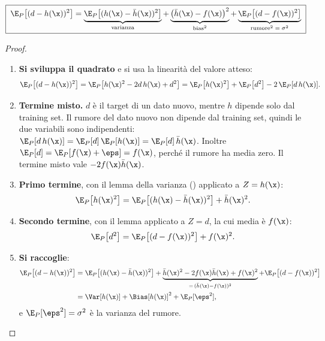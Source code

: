 \begin{teorema}
\begin{equation}\label{eq:bias-varianza}
\boxed{\;\E_P\big[(d-h(\x))^2\big] = \underbrace{\E_P\big[(h(\x)-\bar h(\x))^2\big]}_{\text{varianza}}
+ \underbrace{\big(\bar h(\x)-f(\x)\big)^2}_{\text{bias}^2} + \underbrace{\E_P\big[(d-f(\x))^2\big]}_{\text{rumore}^2 \;=\;\sigma^2}\;}
\end{equation}
\end{teorema}
\begin{proof}
\begin{enumerate}
  \item \textbf{Si sviluppa il quadrato} e si usa la linearità del valore atteso:
        \[
        \E_P\big[(d-h(\x))^2\big] = \E_P\big[h(\x)^2 - 2d\,h(\x) + d^2\big] = \E_P\big[h(\x)^2\big] + \E_P\big[d^2\big] - 2\,\E_P[d\,h(\x)].
        \]
  \item \textbf{Termine misto.} $d$ è il target di un dato nuovo, mentre $h$ dipende solo dal training set. Il
        rumore del dato nuovo non dipende dal training set, quindi le due variabili sono indipendenti:
        $\E_P[d\,h(\x)] = \E_P[d]\,\E_P[h(\x)] = \E_P[d]\,\bar h(\x)$. Inoltre $\E_P[d] = \E_P[f(\x)+\eps] = f(\x)$,
        perché il rumore ha media zero. Il termine misto vale $-2f(\x)\bar h(\x)$.
  \item \textbf{Primo termine}, con il lemma della varianza () applicato a $Z = h(\x)$:
        \[
        \E_P\big[h(\x)^2\big] = \E_P\big[(h(\x)-\bar h(\x))^2\big] + \bar h(\x)^2 .
        \]
  \item \textbf{Secondo termine}, con il lemma applicato a $Z = d$, la cui media è $f(\x)$:
        \[
        \E_P\big[d^2\big] = \E_P\big[(d-f(\x))^2\big] + f(\x)^2 .
        \]
  \item \textbf{Si raccoglie}:
        \begin{align*}
        \E_P\big[(d-h(\x))^2\big] &= \E_P\big[(h(\x)-\bar h(\x))^2\big] + \underbrace{\bar h(\x)^2 - 2f(\x)\bar h(\x) + f(\x)^2}_{=\,(\bar h(\x)-f(\x))^2} + \E_P\big[(d-f(\x))^2\big]\\
        &= \Var[h(\x)] + \Bias[h(\x)]^2 + \E_P[\eps^2] ,
        \end{align*}
        e $\E_P[\eps^2] = \sigma^2$ è la varianza del rumore. \qedhere
\end{enumerate}
\end{proof}

